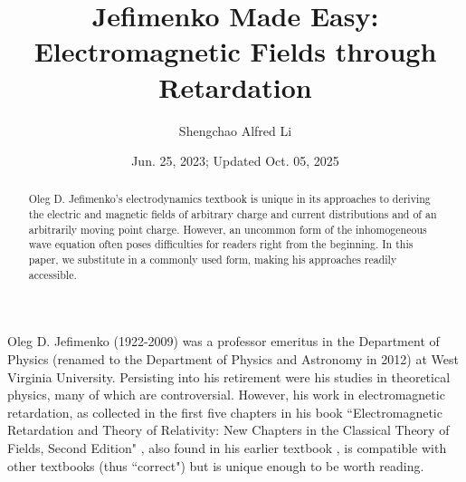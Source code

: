 \documentclass[11pt]{article}              %
\title{\bf Jefimenko Made Easy: Electromagnetic Fields through Retardation}    %
\author{Shengchao Alfred Li}            %
\affil{Amateur scientist in Potomac, Maryland, USA}
\affil{Email: shengchao.li@gmail.com}
\date{Jun. 25, 2023; Updated Oct. 05, 2025}
\begin{document}
\maketitle                              %
\begin{abstract}
Oleg D. Jefimenko's electrodynamics textbook is unique in its approaches to deriving the electric and magnetic fields of arbitrary charge and current distributions and of an arbitrarily moving point charge. However, an uncommon form of the inhomogeneous wave equation often poses difficulties for readers right from the beginning. In this paper, we substitute in a commonly used form, making his approaches readily accessible.
\end{abstract}

Oleg D. Jefimenko (1922-2009) was a professor emeritus in the Department of Physics (renamed to the Department of Physics and Astronomy in 2012) at West Virginia University. Persisting into his retirement were his studies in theoretical physics, many of which are controversial. However, his work in electromagnetic retardation, as collected in the first five chapters in his book ``Electromagnetic Retardation and Theory of Relativity: New Chapters in the Classical Theory of Fields, Second Edition" \cite{jefimenko2004electromagnetic}, also found in his earlier textbook \cite{jefimenko1966electricity}, is compatible with other textbooks (thus ``correct") 
\cite{panofsky1962classical} \cite{matveyev1966principles} \cite{podolsky1969fundamentals} \cite{landau1971classical}  \cite{eyges1972classical} \cite{schwartz1972principles} \cite{reitz1979foundations} \cite{barut1980electrodynamics} \cite{becker1982electromagnetic} \cite{lorrain1988electromagnetic} \cite{heald1995classical}  \cite{jackson1998classical} \cite{schwinger1998classical} \cite{griffiths1999introduction} \cite{melia2001electrodynamics} \cite{brau2004modern} \cite{puri2011classical} \cite{steane2012relativity} \cite{franklin2017classical} \cite{davidson2019introduction} \cite{keohane2019introduction} but is unique enough to be worth reading. 
\end{document}
